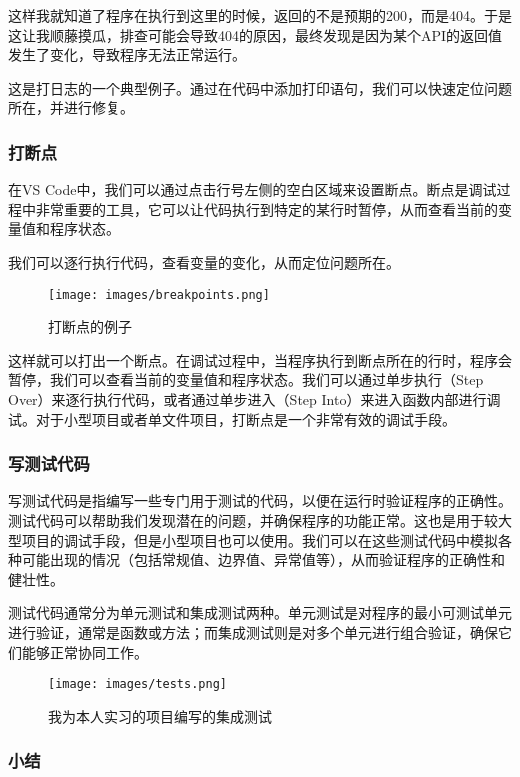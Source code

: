 \documentclass[../main.tex]{subfiles}
\begin{document}
这样我就知道了程序在执行到这里的时候，返回的不是预期的200，而是404。于是这让我顺藤摸瓜，排查可能会导致404的原因，最终发现是因为某个API的返回值发生了变化，导致程序无法正常运行。

这是打日志的一个典型例子。通过在代码中添加打印语句，我们可以快速定位问题所在，并进行修复。

\subsubsection{打断点}

在VS Code中，我们可以通过点击行号左侧的空白区域来设置断点。断点是调试过程中非常重要的工具，它可以让代码执行到特定的某行时暂停，从而查看当前的变量值和程序状态。

我们可以逐行执行代码，查看变量的变化，从而定位问题所在。

\begin{figure}[htbp]
\centering
\texttt{[image: images/breakpoints.png]}
\caption{打断点的例子}
\end{figure}

这样就可以打出一个断点。在调试过程中，当程序执行到断点所在的行时，程序会暂停，我们可以查看当前的变量值和程序状态。我们可以通过单步执行（Step Over）来逐行执行代码，或者通过单步进入（Step Into）来进入函数内部进行调试。对于小型项目或者单文件项目，打断点是一个非常有效的调试手段。

\subsubsection{写测试代码}

写测试代码是指编写一些专门用于测试的代码，以便在运行时验证程序的正确性。测试代码可以帮助我们发现潜在的问题，并确保程序的功能正常。这也是用于较大型项目的调试手段，但是小型项目也可以使用。我们可以在这些测试代码中模拟各种可能出现的情况（包括常规值、边界值、异常值等），从而验证程序的正确性和健壮性。

测试代码通常分为单元测试和集成测试两种。单元测试是对程序的最小可测试单元进行验证，通常是函数或方法；而集成测试则是对多个单元进行组合验证，确保它们能够正常协同工作。

\begin{figure}[htbp]
\centering
\texttt{[image: images/tests.png]}
\caption{我为本人实习的项目编写的集成测试}
\end{figure}

\subsubsection{小结}
\end{document}
